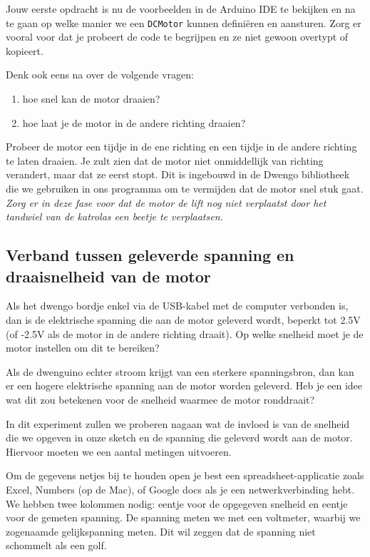 \documentclass[a4paper, 10pt]{article}
\begin{document}
Jouw eerste opdracht is nu de voorbeelden in de Arduino IDE te bekijken en na te gaan op welke manier we een
\texttt{DCMotor} kunnen defini\"eren en aansturen. Zorg er vooral voor dat je probeert de code te begrijpen en ze
niet gewoon overtypt of kopieert.

Denk ook eens na over de volgende vragen:

\begin{enumerate}
\item hoe snel kan de motor draaien?
\item hoe laat je de motor in de andere richting draaien?
\end{enumerate}

Probeer de motor een tijdje in de ene richting en een tijdje in de andere richting te laten draaien. Je zult zien dat
de motor niet onmiddellijk van richting verandert, maar dat ze eerst stopt. Dit is ingebouwd in de Dwengo bibliotheek
die we gebruiken in ons programma om te vermijden dat de motor snel stuk gaat. {\em Zorg er in deze fase voor dat de motor de
lift nog niet verplaatst door het tandwiel van de katrolas een beetje te verplaatsen.}

\subsection{Verband tussen geleverde spanning en draaisnelheid van de motor}

Als het dwengo bordje enkel via de USB-kabel met de computer verbonden is, dan is de elektrische spanning die aan de motor
geleverd wordt, beperkt tot 2.5V (of -2.5V als de motor in de andere richting draait). Op welke snelheid moet je de motor
instellen om dit te bereiken?

Als de dwenguino echter stroom krijgt van een sterkere spanningsbron, dan kan er een hogere elektrische spanning aan de
motor worden geleverd. Heb je een idee wat dit zou betekenen voor de snelheid waarmee de motor ronddraait?

In dit experiment zullen we proberen nagaan wat de invloed is van de snelheid die we opgeven in onze sketch en de spanning
die geleverd wordt aan de motor. Hiervoor moeten we een aantal metingen uitvoeren.

Om de gegevens netjes bij te houden open je best een spreadsheet-applicatie zoals Excel, Numbers (op de Mac), of Google
docs als je een netwerkverbinding hebt. We hebben twee kolommen nodig: eentje voor de opgegeven snelheid en eentje voor
de gemeten spanning. De spanning meten we met een voltmeter, waarbij we zogenaamde gelijkspanning meten. Dit wil zeggen
dat de spanning niet schommelt als een golf.
\end{document}
